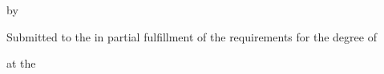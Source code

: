 \begin{titlepage}
\centering

\Large

\MakeUppercase{\thesisTitle}

\vspace{0.1in}

\large

by

\vspace{0.1in}

\Large

\MakeUppercase{\thesisAuthor}

\vspace{0.1in}

\large

Submitted to the \thesisDepartment in partial fulfillment of the requirements for the degree of

\vspace{0.1in}

\thesisDegree

\vspace{0.1in}

at the

\vspace{0.1in}

\MakeUppercase{\thesisInstitution}

\vspace{0.1in}

\thesisGraduationDate
\end{titlepage}